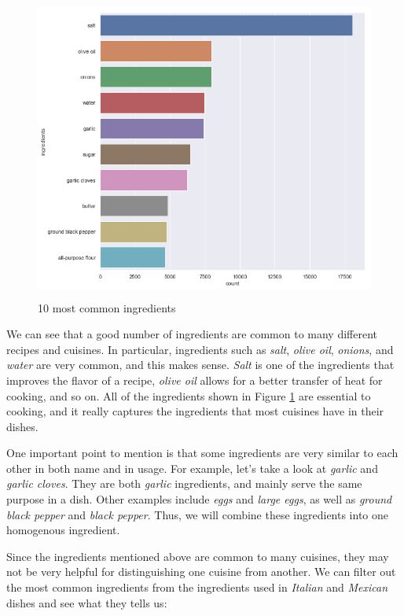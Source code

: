 \documentclass[12pt]{article}
\begin{document}
\begin{figure}[!h]
\includegraphics[width=\textwidth, height=10cm]{10-most-common-ingredients.png}
\caption{10 most common ingredients}
\label{fig:common-ingredients}
\end{figure}

We can see that a good number of ingredients are common to many different recipes and cuisines. In particular, ingredients such as \textit{salt}, \textit{olive oil}, \textit{onions}, and \textit{water} are very common, and this makes sense. \textit{Salt} is one of the ingredients that improves the flavor of a recipe, \textit{olive oil} allows for a better transfer of heat for cooking, and so on. All of the ingredients shown in Figure \ref{fig:common-ingredients} are essential to cooking, and it really captures the ingredients that most cuisines have in their dishes.

One important point to mention is that some ingredients are very similar to each other in both name and in usage. For example, let's take a look at \textit{garlic} and \textit{garlic cloves}. They are both \textit{garlic} ingredients, and mainly serve the same purpose in a dish. Other examples include \textit{eggs} and \textit{large eggs}, as well as \textit{ground black pepper} and \textit{black pepper}. Thus, we will combine these ingredients into one homogenous ingredient.

Since the ingredients mentioned above are common to many cuisines, they may not be very helpful for distinguishing one cuisine from another. We can filter out the most common ingredients from the ingredients used in \textit{Italian} and \textit{Mexican} dishes and see what they tells us:
\end{document}
